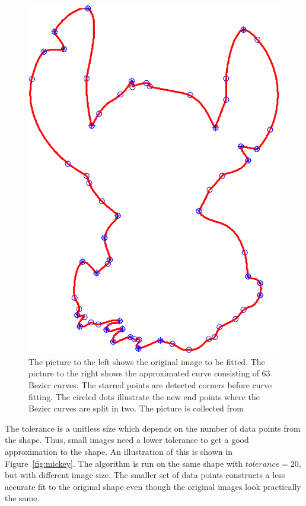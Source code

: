 \documentclass[10pt]{article}
\begin{document}
\begin{figure}
\begin{minipage}[t]{.5\textwidth}
    \includegraphics[scale=0.52]{figure6-crop.pdf}
\end{minipage}\hfill
\caption{The picture to the left shows the original image to be fitted. The picture to the right shows the approximated curve consisting of 63 Bezier curves. The starred points are detected corners before curve fitting. The circled dots illustrate the new end points where the Bezier curves are split in two. The picture is collected from \cite{pic:stitch}}
\label{fig:stitch}
\end{figure}

The tolerance is a unitless size which depends on the number of data points from the shape. Thus, small images need a lower tolerance to get a good approximation to the shape.  An illustration of this is shown in Figure~\ref{fig:mickey}. The algorithm is run on the same shape with $tolerance = 20$, but with different image size. The smaller set of data points constructs a less accurate fit to the original shape even though the original images look practically the same. 
\end{document}
